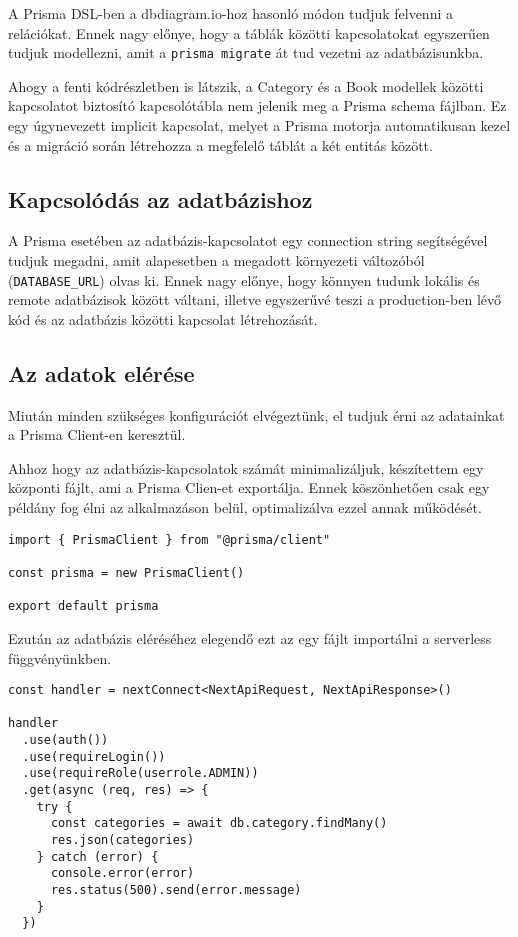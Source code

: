 A Prisma DSL-ben a dbdiagram.io-hoz hasonló módon tudjuk felvenni a relációkat. Ennek nagy előnye, hogy a táblák közötti kapcsolatokat
egyszerűen tudjuk modellezni, amit a \lstinline|prisma migrate| át tud vezetni az adatbázisunkba.

Ahogy a fenti kódrészletben is látszik, a Category és a Book modellek közötti kapcsolatot biztosító kapcsolótábla nem jelenik
meg a Prisma schema fájlban. Ez egy úgynevezett implicit kapcsolat, melyet a Prisma motorja automatikusan kezel és a migráció során
létrehozza a megfelelő táblát a két entitás között.

\subsection{Kapcsolódás az adatbázishoz}
A Prisma esetében az adatbázis-kapcsolatot egy connection string segítségével tudjuk megadni, amit alapesetben
a megadott környezeti változóból (\lstinline|DATABASE_URL|) olvas ki. Ennek nagy előnye, hogy könnyen tudunk lokális
és remote adatbázisok között váltani, illetve egyszerűvé teszi a production-ben lévő kód és az adatbázis közötti
kapcsolat létrehozását.

\subsection{Az adatok elérése}

Miután minden szükséges konfigurációt elvégeztünk, el tudjuk érni az adatainkat a Prisma Client-en keresztül.

Ahhoz hogy az adatbázis-kapcsolatok számát minimalizáljuk, készítettem egy központi fájlt, ami a Prisma Clien-et exportálja.
Ennek köszönhetően csak egy példány fog élni az alkalmazáson belül, optimalizálva ezzel annak működését.

\begin{lstlisting}[caption=Prisma Client export]
import { PrismaClient } from "@prisma/client"

const prisma = new PrismaClient()

export default prisma
\end{lstlisting}

Ezután az adatbázis eléréséhez elegendő ezt az egy fájlt importálni a serverless függvényünkben.

\begin{lstlisting}[caption=Adatelérés next-connect middleware és Prisma segítségével]
const handler = nextConnect<NextApiRequest, NextApiResponse>()

handler
  .use(auth())
  .use(requireLogin())
  .use(requireRole(userrole.ADMIN))
  .get(async (req, res) => {
    try {
      const categories = await db.category.findMany()
      res.json(categories)
    } catch (error) {
      console.error(error)
      res.status(500).send(error.message)
    }
  })
\end{lstlisting}
